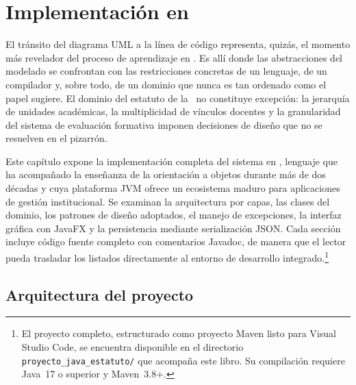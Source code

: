 
\chapter{Implementación en \java}
\label{cap:java}


\noindent
El tránsito del diagrama UML a la línea de código representa, quizás, el momento más
revelador del proceso de aprendizaje en \poo. Es allí donde las abstracciones del
modelado se confrontan con las restricciones concretas de un lenguaje, de un compilador
y, sobre todo, de un dominio que nunca es tan ordenado como el papel sugiere. El dominio
del estatuto de la \ud\ no constituye excepción: la jerarquía de unidades académicas,
la multiplicidad de vínculos docentes y la granularidad del sistema de evaluación
formativa imponen decisiones de diseño que no se resuelven en el pizarrón.

Este capítulo expone la implementación completa del sistema en \java, lenguaje que
ha acompañado la enseñanza de la orientación a objetos durante más de dos décadas y
cuya plataforma JVM ofrece un ecosistema maduro para aplicaciones de gestión institucional.
Se examinan la arquitectura por capas, las clases del dominio, los patrones de diseño
adoptados, el manejo de excepciones, la interfaz gráfica con JavaFX y la persistencia
mediante serialización JSON. Cada sección incluye código fuente completo con comentarios
Javadoc, de manera que el lector pueda trasladar los listados directamente al entorno
de desarrollo integrado.\footnote{El proyecto completo, estructurado como proyecto Maven
listo para Visual Studio Code, se encuentra disponible en el directorio
\texttt{proyecto\_java\_estatuto/} que acompaña este libro. Su compilación requiere
Java~17 o superior y Maven~3.8+.}

\section{Arquitectura del proyecto \java}
\label{sec:java-arquitectura}

